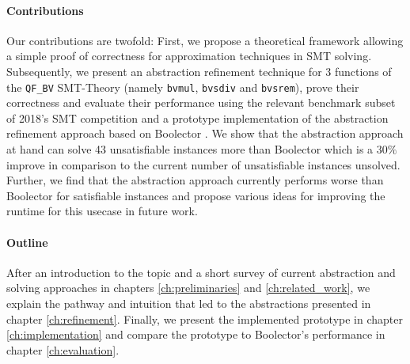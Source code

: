 \paragraph{Contributions}
Our contributions are twofold:
First, we propose a theoretical framework allowing a simple proof of correctness for approximation techniques in SMT solving.
Subsequently, we present an abstraction refinement technique for 3 functions of the \texttt{QF\_BV} SMT-Theory (namely \texttt{bvmul}, \texttt{bvsdiv} and \texttt{bvsrem}), prove their correctness and evaluate their performance using the relevant benchmark subset of 2018's SMT competition \cite{SMTCOMP18} and a prototype implementation of the abstraction refinement approach based on Boolector \cite{NiemetzPreinerBiere-JSAT15}.
We show that the abstraction approach at hand can solve 43 unsatisfiable instances more than Boolector which is a $30\%$ improve in comparison to the current number of unsatisfiable instances unsolved. Further, we find that the abstraction approach currently performs worse than Boolector for satisfiable instances and propose various ideas for improving the runtime for this usecase in future work.


\paragraph{Outline}
After an introduction to the topic and a short survey of current abstraction and solving approaches in chapters \ref{ch:preliminaries} and \ref{ch:related_work}, we explain the pathway and intuition that led to the abstractions presented in chapter \ref{ch:refinement}. Finally, we present the implemented prototype in chapter \ref{ch:implementation} and compare the prototype to Boolector's performance in chapter \ref{ch:evaluation}.
